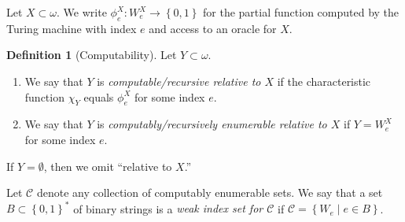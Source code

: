 \documentclass[10pt,letterpaper,cm]{nupset}
\theoremstyle{definition}
\newtheorem{definition}{Definition}
\theoremstyle{theorem}
\theoremstyle{remark}
\newcommand{\1}{\mathbb{1}}
\newcommand{\0}{\vec 0}
\newcommand{\be}{\begin{enumerate}}
\newcommand{\ee}{\end{enumerate}}
\begin{document}
\medskip

Let $X\subset \omega$. We write $\phi_e^X: W_e^X \to \left\{0,1\right\}$ for the partial function computed by the Turing machine with index $e$ and access to an oracle for $X$. 

\begin{definition}[Computability] Let $Y\subset \omega$.
\be
\item We say that $Y$ is \textit{computable/recursive relative to $X$} if the characteristic function $\chi_Y$ equals $\phi_e^X$ for some index $e$.
\item We say that $Y$ is \textit{computably/recursively enumerable relative to $X$} if $Y= W_e^X$ for some index $e$.
\ee
If $Y= \emptyset$, then we omit ``relative to $X$.''
\end{definition}

Let $\mathcal{C}$ denote any collection of computably enumerable sets. We say that a set $B\subset \left\{0,1\right\}^{\ast}$ of binary strings is a \textit{weak index set for $\mathcal{C}$} if $\mathcal{C} = \left\{W_e \mid e \in B\right\}$. 
\end{document}
